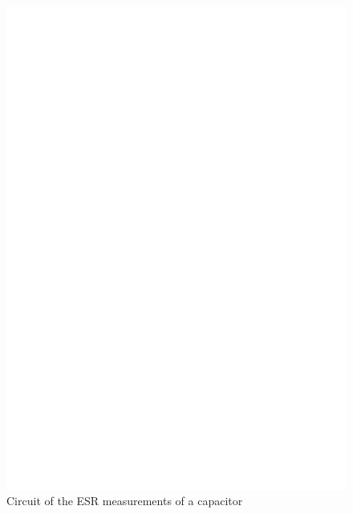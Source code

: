 \begin{figure}[H]
  \centering
    \includegraphics[]{../FIG/Cap_esr.eps}
  \caption{Circuit of the ESR measurements of a capacitor}
  \label{fig:Cap_esr}
\end{figure}


